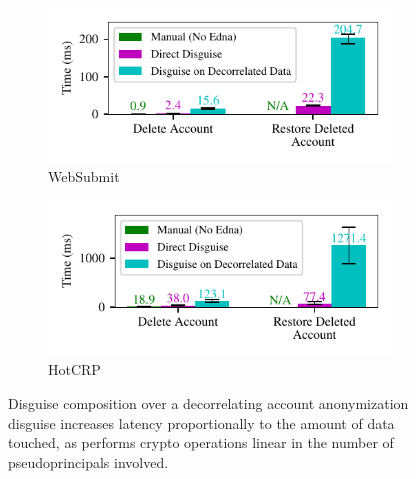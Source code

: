 \begin{figure}[t]
    \centering
    \begin{subfigure}[b]{\columnwidth}
        \includegraphics{figs/composition_stats_websubmit}
        \caption{WebSubmit}
        \label{f:comp-websubmit}
      \end{subfigure}
      \begin{subfigure}[b]{\columnwidth}
        \includegraphics{figs/composition_stats_hotcrp}
          \caption{HotCRP}
        \label{f:comp-hotcrp}
      \end{subfigure}
    \caption{Disguise composition over a decorrelating account
      anonymization disguise increases latency proportionally
      to the amount of data touched, as \sys performs
      crypto operations linear in the number of pseudoprincipals
      involved.}
    \label{f:composition}
\end{figure}

